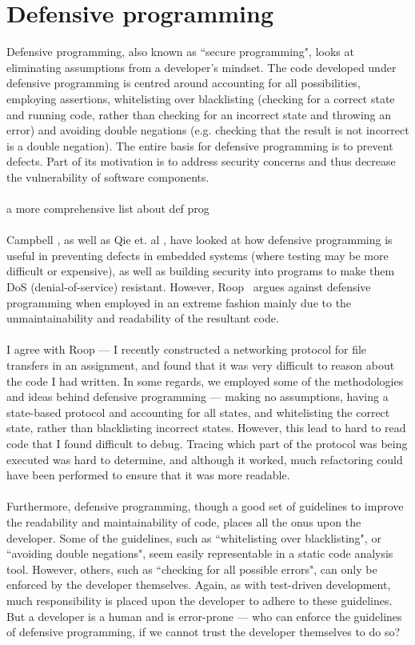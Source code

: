 \section{Defensive programming} \label{sec:otherdets:defProg}

Defensive programming, also known as ``secure programming", looks at eliminating assumptions from
a developer's mindset.
The code developed under defensive programming is centred around accounting for all possibilities,
employing assertions, whitelisting over blacklisting (checking for a correct state and running code,
rather than checking for an incorrect state and throwing an error) and avoiding double negations (e.g. checking that
the result is not incorrect is a double negation).
The entire basis for defensive programming is to prevent defects.
Part of its motivation is to address security concerns and thus decrease the vulnerability of
software components.\\
\\
\FIXME a more comprehensive list about def prog\\
\\
Campbell \cite{campbell1998defensive}, as well as Qie et. al \cite{qie2002defensive}, have looked at
how defensive programming is useful in preventing defects in embedded systems (where testing may
be more difficult or expensive), as well as building security into programs to make them DoS
(denial-of-service) resistant.
However, Roop \FIXME\ argues against defensive programming when employed in an extreme fashion
mainly due to the unmaintainability and readability of the resultant code.\\
\\
I agree with Roop --- I recently constructed a networking protocol for file transfers in an
assignment, and found that it was very difficult to reason about the code I had written.
In some regards, we employed some of the methodologies and ideas behind defensive programming ---
making no assumptions, having a state-based protocol and accounting for all states, and whitelisting
the correct state, rather than blacklisting incorrect states.
However, this lead to hard to read code that I found difficult to debug.
Tracing which part of the protocol was being executed was hard to determine, and although it worked,
much refactoring could have been performed to ensure that it was more readable.\\
\\
Furthermore, defensive programming, though a good set of guidelines to improve the readability and
maintainability of code, places all the onus upon the developer.
Some of the guidelines, such as ``whitelisting over blacklisting", or ``avoiding double negations",
seem easily representable in a static code analysis tool.
However, others, such as ``checking for all possible errors", can only be enforced by the developer
themselves.
Again, as with test-driven development, much responsibility is placed upon the developer to adhere
to these guidelines.
But a developer is a human and is error-prone --- who can enforce the guidelines of defensive
programming, if we cannot trust the developer themselves to do so?

